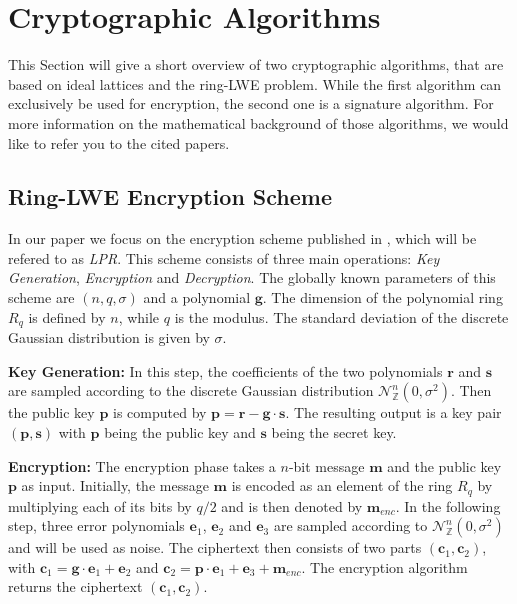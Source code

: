 \section{Cryptographic Algorithms}
This Section will give a short overview of two cryptographic algorithms, that are based on ideal lattices and the \ac{ring-LWE} problem. While the first algorithm can exclusively be used for encryption, the second one is a signature algorithm. For more information on the mathematical background of those algorithms, we would like to refer you to the cited papers.

\subsection{Ring-LWE Encryption Scheme}
In our paper we focus on the encryption scheme published in \cite{cryptoeprint:2012:230}, which will be refered to as \textit{\ac{LPR}}. This scheme consists of three main operations: \textit{Key Generation}, \textit{Encryption} and \textit{Decryption}. The globally known parameters of this scheme are \((n, q, \sigma)\) and a polynomial \(\textbf{g}\). The dimension of the polynomial ring \(R_q\) is defined by \(n\), while \(q\) is the modulus. The standard deviation of the discrete Gaussian distribution is given by \(\sigma\).

\textbf{Key Generation:} In this step, the coefficients of the two polynomials \(\textbf{r}\) and \(\textbf{s}\) are sampled according to the discrete Gaussian distribution \(\mathcal{N}_\mathbb{Z}^{n} (0, \sigma^2)\). Then the public key \(\textbf{p}\) is computed by \(\textbf{p} = \textbf{r} - \textbf{g} \cdot \textbf{s}\). The resulting output is a key pair \((\textbf{p}, \textbf{s})\) with \(\textbf{p}\) being the public key and \(\textbf{s}\) being the secret key.

\textbf{Encryption:} The encryption phase takes a \(n\)-bit message \(\textbf{m}\) and the public key \(\textbf{p}\) as input. Initially, the message \(\textbf{m}\) is encoded as an element of the ring \(R_q\) by multiplying each of its bits by \(q/2\) and is then denoted by \(\textbf{m}_{enc}\). In the following step, three error polynomials \(\textbf{e}_1\), \(\textbf{e}_2\) and \(\textbf{e}_3\) are sampled according to \(\mathcal{N}_\mathbb{Z}^{n} (0, \sigma^2)\) and will be used as noise. The ciphertext then consists of two parts \((\textbf{c}_1, \textbf{c}_2)\), with \(\textbf{c}_1 = \textbf{g} \cdot \textbf{e}_1 + \textbf{e}_2\) and \(\textbf{c}_2 = \textbf{p} \cdot \textbf{e}_1 + \textbf{e}_3 + \textbf{m}_{enc}\). The encryption algorithm returns the ciphertext \((\textbf{c}_1,\textbf{c}_2)\).

